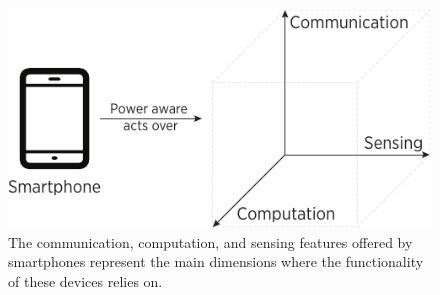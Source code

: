 \documentclass[ENG,PhD]{cinvestav}
\begin{document}
\begin{figure}[t]
  \centering
  \includegraphics[scale=0.9]{smartphone-dimensions}
  \caption{The communication, computation, and sensing features offered by smartphones represent the main dimensions where the functionality of these devices relies on.}
  \label{fig:smartphone-dimensions}
\end{figure}
\end{document}
